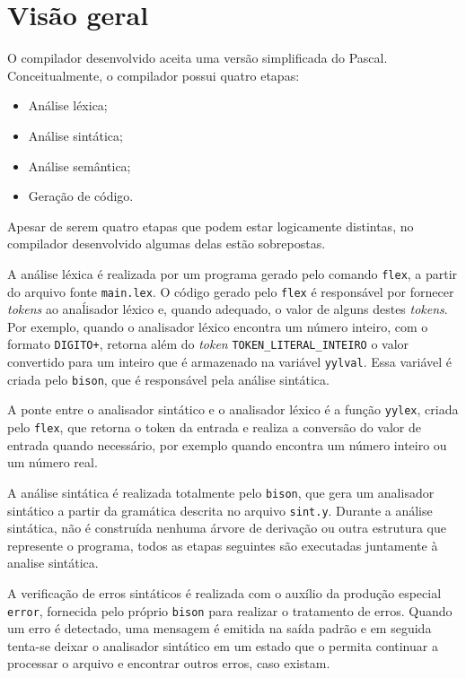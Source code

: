\section{Visão geral}
O compilador desenvolvido aceita uma versão simplificada do Pascal.
Conceitualmente, o compilador possui quatro etapas:

\begin{itemize}
	\item Análise léxica;
	\item Análise sintática;
	\item Análise semântica;
	\item Geração de código.
\end{itemize}

Apesar de serem quatro etapas que podem estar logicamente distintas, no
compilador desenvolvido algumas delas estão sobrepostas.

A análise léxica é realizada por um programa gerado pelo comando \texttt{flex},
a partir do arquivo fonte \texttt{main.lex}. O código gerado pelo \texttt{flex}
é responsável por fornecer \emph{tokens} ao anaĺisador léxico e, quando
adequado, o valor de alguns destes \emph{tokens}. Por exemplo, quando o
analisador léxico encontra um número inteiro, com o formato \texttt{DIGITO+},
retorna além do \emph{token} \texttt{TOKEN\_LITERAL\_INTEIRO} o valor
convertido para um inteiro que é armazenado na variável \texttt{yylval}. Essa
variável é criada pelo \texttt{bison}, que é responsável pela análise
sintática.

A ponte entre o analisador sintático e o analisador léxico é a função
\texttt{yylex}, criada pelo \texttt{flex}, que retorna o token da entrada e
realiza a conversão do valor de entrada quando necessário, por exemplo quando
encontra um número inteiro ou um número real.

A análise sintática é realizada totalmente pelo \texttt{bison}, que gera um
analisador sintático a partir da gramática descrita no arquivo \texttt{sint.y}.
Durante a análise sintática, não é construída nenhuma árvore de derivação ou
outra estrutura que represente o programa, todos as etapas seguintes são
executadas juntamente à analise sintática.

A verificação de erros sintáticos é realizada com o auxílio da produção
especial \texttt{error}, fornecida pelo próprio \texttt{bison} para realizar o
tratamento de erros. Quando um erro é detectado, uma mensagem é emitida na
saída padrão e em seguida tenta-se deixar o analisador sintático em um estado
que o permita continuar a processar o arquivo e encontrar outros erros, caso
existam.

